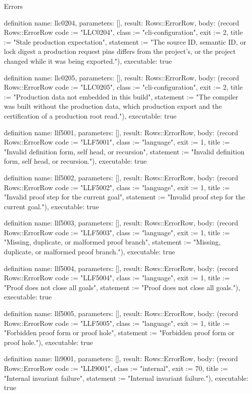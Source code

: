 \begin{lexlean}{Errors}
\begin{semanticmodule}
definition{
  name: llc0204,
  parameters: [],
  result: Rows::ErrorRow,
  body: (record Rows::ErrorRow {code := "LLC0204", class := "cli-configuration", exit := 2, title := "Stale production expectation", statement := "The source ID, semantic ID, or lock digest a production request pins differs from the project's, or the project changed while it was being exported."}),
  executable: true
}

definition{
  name: llc0205,
  parameters: [],
  result: Rows::ErrorRow,
  body: (record Rows::ErrorRow {code := "LLC0205", class := "cli-configuration", exit := 2, title := "Production data not embedded in this build", statement := "The compiler was built without the production data, which production export and the certification of a production root read."}),
  executable: true
}

definition{
  name: llf5001,
  parameters: [],
  result: Rows::ErrorRow,
  body: (record Rows::ErrorRow {code := "LLF5001", class := "language", exit := 1, title := "Invalid definition form, self head, or recursion", statement := "Invalid definition form, self head, or recursion."}),
  executable: true
}

definition{
  name: llf5002,
  parameters: [],
  result: Rows::ErrorRow,
  body: (record Rows::ErrorRow {code := "LLF5002", class := "language", exit := 1, title := "Invalid proof step for the current goal", statement := "Invalid proof step for the current goal."}),
  executable: true
}

definition{
  name: llf5003,
  parameters: [],
  result: Rows::ErrorRow,
  body: (record Rows::ErrorRow {code := "LLF5003", class := "language", exit := 1, title := "Missing, duplicate, or malformed proof branch", statement := "Missing, duplicate, or malformed proof branch."}),
  executable: true
}

definition{
  name: llf5004,
  parameters: [],
  result: Rows::ErrorRow,
  body: (record Rows::ErrorRow {code := "LLF5004", class := "language", exit := 1, title := "Proof does not close all goals", statement := "Proof does not close all goals."}),
  executable: true
}

definition{
  name: llf5005,
  parameters: [],
  result: Rows::ErrorRow,
  body: (record Rows::ErrorRow {code := "LLF5005", class := "language", exit := 1, title := "Forbidden proof form or proof hole", statement := "Forbidden proof form or proof hole."}),
  executable: true
}

definition{
  name: lli9001,
  parameters: [],
  result: Rows::ErrorRow,
  body: (record Rows::ErrorRow {code := "LLI9001", class := "internal", exit := 70, title := "Internal invariant failure", statement := "Internal invariant failure."}),
  executable: true
}


\end{semanticmodule}
\end{lexlean}
